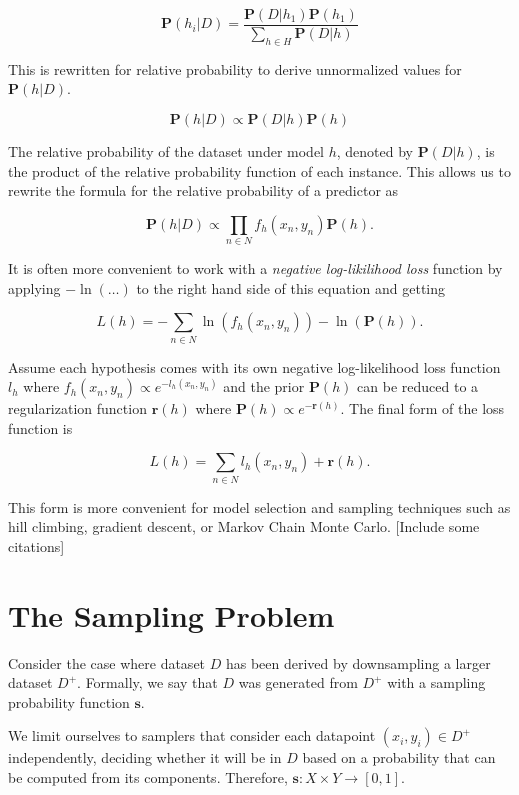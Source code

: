 \documentclass[twoside]{article}
\begin{document}
\[\mathbf{P}(h_i|D)=\frac{\mathbf{P}(D|h_1)\mathbf{P}(h_1)}{\sum_{h \in H}\mathbf{P}(D|h)}\]

This is rewritten for relative probability to derive unnormalized values for \(\mathbf{P}(h|D)\).

\begin{equation}
\label{eq:bayes}
\mathbf{P}(h|D)\propto\mathbf{P}(D|h)\mathbf{P}(h)
\end{equation}

The relative probability of the dataset under model \(h\), denoted by \(\mathbf{P}(D|h)\), is the product of the relative probability function of each instance. This allows us to rewrite the formula for the relative probability of a predictor as

\[\mathbf{P}(h|D)\propto\prod_{n \in N} f_h(x_n,y_n)\mathbf{P}(h).\]

It is often more convenient to work with a \textit{negative log-likilihood loss} function by applying \(-\ln(\ldots)\) to the right hand side of this equation and getting

\[L(h)=-\sum_{n \in N} \ln(f_h(x_n,y_n))-\ln(\mathbf{P}(h)).\]

Assume each hypothesis comes with its own negative log-likelihood loss function \(l_h\) where \(f_h(x_n,y_n)\propto e^{-l_h(x_n,y_n)}\) and the prior \(\mathbf{P}(h)\) can be reduced to a regularization function \(\mathbf{r}(h)\) where \(\mathbf{P}(h)\propto e^{-\mathbf{r}(h)}\). The final form of the loss function is

\[L(h)=\sum_{n \in N} l_h(x_n,y_n)+\mathbf{r}(h).\]

This form is more convenient for model selection and sampling techniques such as hill climbing, gradient descent, or Markov Chain Monte Carlo. [Include some citations]

\section{The Sampling Problem}
\label{section:problem}

Consider the case where dataset \(D\) has been derived by downsampling a larger dataset \(D^+\). Formally, we say that \(D\) was generated from \(D^+\) with a sampling probability function \(\mathbf{s}\).

We limit ourselves to samplers that consider each datapoint \((x_i, y_i) \in D^+\) independently, deciding whether it will be in \(D\) based on a probability that can be computed from its components. Therefore, \(\mathbf{s}: X \times Y \rightarrow \left [ 0, 1\right ]\).
\end{document}
